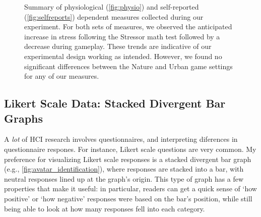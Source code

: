 \begin{figure}[b!]
\begin{subfigure}{.45\textwidth}
\end{subfigure}
\caption{Summary of physiological (\autoref{fig:physio}) and self-reported (\autoref{fig:selfreports}) dependent measures collected during our experiment. For both sets of measures, we observed the anticipated increase in stress following the Stressor math test followed by a decrease during gameplay. These trends are indicative of our experimental design working as intended. However, we found no significant differences between the Nature and Urban game settings for any of our measures.}
\label{fig:summary}


\end{figure}




\newpage
\subsection{Likert Scale Data: Stacked Divergent Bar Graphs}

A \emph{lot} of HCI research involves questionnaires, and interpreting diferences in questionnaire respones. For instance, Likert scale questions are very common. My preference for visualizing Likert scale responses is a stacked divergent bar graph (e.g., \autoref{fig:avatar_identification}), where responses are stacked into a bar, with neutral responses lined up at the graph's origin. This type of graph has a few properties that make it useful: in particular, readers can get a quick sense of `how positive' or `how negative' responses were based on the bar's position, while still being able to look at how many responses fell into each category. 

